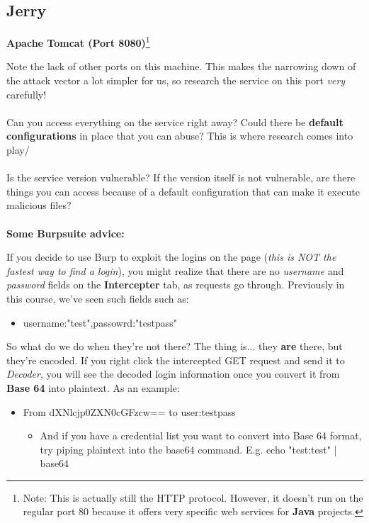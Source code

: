 \documentclass[a4paper,11pt]{article}
\renewcommand{\tt}[2][tt]{\textcolor{#1}{\ttfamily #2}}%
\begin{document}
\begin{center}
\subsection{Jerry}
\end{center}

{\bfseries Apache Tomcat (Port 8080)}\footnote[2]{Note: This is actually still the HTTP protocol. However, it doesn't run on the regular port 80 because it offers very specific web services for {\bfseries Java} projects.}

Note the lack of other ports on this machine. This makes the narrowing down of the attack vector a lot simpler for us, so research the service on this port \textit{very} carefully!
\\
\\
Can you access everything on the service right away? Could there be {\bfseries default configurations} in place that you can abuse? This is where research comes into play/
\\
\\
Is the service version vulnerable? If the version itself is not vulnerable, are there things you can access because of a default configuration that can make it execute malicious files?
\\
\\
{\bfseries Some Burpsuite advice:}

If you decide to use Burp to exploit the logins on the page (\textit{this is NOT the fastest way to find a login}), you might realize that there are no \textit{username} and \textit{password} fields on the {\bfseries Intercepter} tab, as requests go through. Previously in this course, we've seen such fields such as:
\\
\begin{itemize}
\item \tt{username:"test",passowrd:"testpass"}
\end{itemize}
So what do we do when they're not there? The thing is... they {\bfseries are} there, but they're encoded. If you right click the intercepted \tt{GET} request and send it to \textit{Decoder}, you will see the decoded login information once you convert it from {\bfseries Base 64} into plaintext. As an example:

\begin{itemize}
    \item From \tt{dXNlcjp0ZXN0cGFzcw==} to \tt{user:testpass}
    \begin{itemize}
        \item And if you have a credential list you want to convert into Base 64 format, try \tt{piping} plaintext into the \tt{base64} command. E.g. \tt{echo "test:test" | base64}
    \end{itemize}
\end{itemize}
\end{document}
